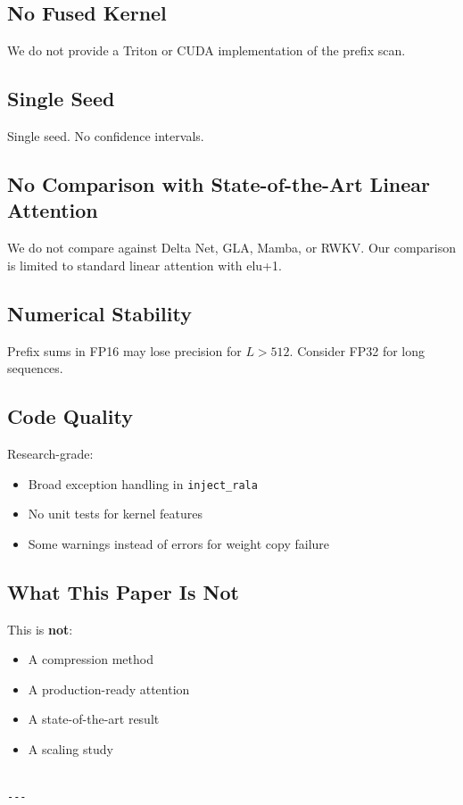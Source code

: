 \subsection{No Fused Kernel}

We do not provide a Triton or CUDA implementation of the prefix scan.

\subsection{Single Seed}

Single seed. No confidence intervals.

\subsection{No Comparison with State-of-the-Art Linear Attention}

We do not compare against Delta Net, GLA, Mamba, or RWKV. Our comparison is 
limited to standard linear attention with elu+1.

\subsection{Numerical Stability}

Prefix sums in FP16 may lose precision for $L > 512$. Consider FP32 for long 
sequences.

\subsection{Code Quality}

Research-grade:
\begin{itemize}
\item Broad exception handling in \texttt{inject\_rala}
\item No unit tests for kernel features
\item Some warnings instead of errors for weight copy failure

\end{itemize}
\subsection{What This Paper Is Not}

This is \textbf{not}:
\begin{itemize}
\item A compression method
\item A production-ready attention
\item A state-of-the-art result
\item A scaling study
\end{itemize}
\begin{lstlisting}

---
\end{lstlisting}